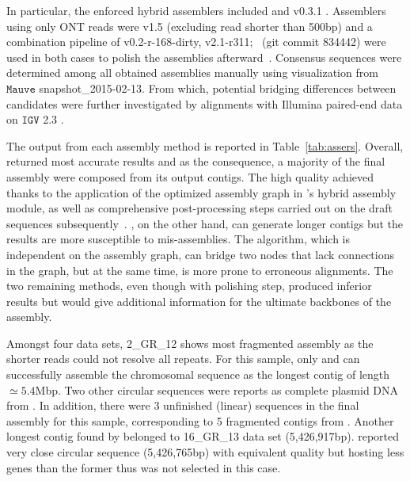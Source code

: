 In particular, the enforced hybrid assemblers included \npscarf{} and \unicycler{} v0.3.1 \cite{Wick2017unicycler}. Assemblers using only ONT reads were \canu{} v1.5 \cite{Koren2017canu} (excluding read shorter than 500bp) and a combination pipeline of \miniasm{} v0.2-r-168-dirty, \minimap{} v2.1-r311; \racon{}~(git commit 834442) were used in both cases to polish the assemblies afterward~\cite{Vaser2017racon}. Consensus sequences were determined among all obtained assemblies manually using visualization from $\mathtt{Mauve}$ \cite{Darling2011mauve} snapshot\_2015-02-13. 
From which, potential bridging differences between candidates were further investigated by alignments with Illumina paired-end data on $\mathtt{IGV}$ 2.3 \cite{Robinson2011IGV,Thorvaldsdottir2013IGV}. 

The output from each assembly method is reported in Table~\ref{tab:assers}. 
Overall, \unicycler{} returned most accurate results and as the consequence, a majority of the final assembly were composed from its output contigs. The high quality achieved thanks to the application of the optimized assembly graph in \unicycler{}'s hybrid assembly module, as well as comprehensive post-processing steps carried out on the draft sequences subsequently~\cite{Wick2017unicycler}. 
\npscarf{}, on the other hand, can generate longer contigs but the results are more susceptible to mis-assemblies. The algorithm, which is independent on the assembly graph, can bridge two nodes that lack connections in the graph, but at the same time, is more prone to erroneous alignments. 
The two remaining methods, even though with polishing step, produced inferior results but would give additional information for the ultimate backbones of the assembly.

Amongst four data sets, 2\_GR\_12 shows most fragmented assembly as the shorter reads could not resolve all repeats. For this sample, only \npscarf{} and \canu{} can successfully assemble the chromosomal sequence as the longest contig of length $\simeq 5.4$Mbp. Two other circular sequences were reports as complete plasmid DNA from \unicycler{}. In addition, there were 3 unfinished (linear) sequences in the final assembly for this sample, corresponding to 5 fragmented contigs from \unicycler{}. Another longest contig found by \npscarf{} belonged to 16\_GR\_13 data set (5,426,917bp). \unicycler{} reported very close circular sequence (5,426,765bp) with equivalent quality but hosting less genes than the former thus was not selected in this case. %

